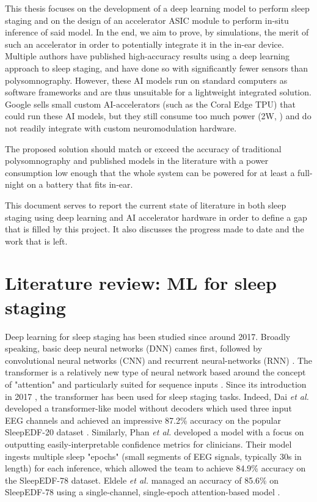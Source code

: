 \documentclass[12pt]{article}
\begin{document}
    This thesis focuses on the development of a deep learning model to perform sleep staging and on the design of an accelerator ASIC module to perform in-situ inference of said model. In the end, we aim to prove, by simulations, the merit of such an accelerator in order to potentially integrate it in the in-ear device.
    Multiple authors \cite{dutt2023sleepxai, fu2021deep, eldele2021attention} have published high-accuracy results using a deep learning approach to sleep staging, and have done so with significantly fewer sensors than polysomnography. However, these AI models run on standard computers as software frameworks and are
    thus unsuitable for a lightweight integrated solution. Google sells small custom AI-accelerators (such as the Coral Edge TPU) that could run these AI models, but they still consume too much power (2W, \cite{coral_datasheet}) and do not readily integrate with custom neuromodulation hardware.
    
    The proposed solution should match or exceed the accuracy of traditional polysomnography and published models in the literature with a power consumption low enough that the whole system can be powered for at least a full-night on a battery that fits in-ear.

    This document serves to report the current state of literature in both sleep staging using deep learning and AI accelerator hardware in order to define a gap that is filled by this project. It also discusses the progress made to date and the work that is left.

    \section{Literature review: ML for sleep staging}
    Deep learning for sleep staging has been studied since around 2017. Broadly speaking, basic deep neural networks (DNN) cames first, followed by convolutional neural networks (CNN) and recurrent neural-networks (RNN) \cite{phan2022sleeptransformer}.
    The transformer is a relatively new type of neural network based around the concept of "attention" and particularly suited for sequence inputs \cite{han2022survey}. Since its introduction in 2017 \cite{vaswani2017attention}, the transformer has been used for sleep staging tasks. Indeed, Dai \textit{et al.} developed a transformer-like
    model without decoders which used three input EEG channels and achieved an impressive 87.2\% accuracy on the popular SleepEDF-20 dataset \cite{dai2023multichannelsleepnet}. Similarly, Phan \textit{et al.} developed a model with a focus on outputting easily-interpretable confidence metrics for clinicians. Their model ingests multiple 
    sleep "epochs" (small segments of EEG signals, typically 30s in length) for each inference, which allowed the team to achieve 84.9\% accuracy on the SleepEDF-78 dataset. Eldele \textit{et al.} managed an accuracy of 85.6\% on SleepEDF-78 using a single-channel, single-epoch attention-based model \cite{eldele2021attention}.
\end{document}
